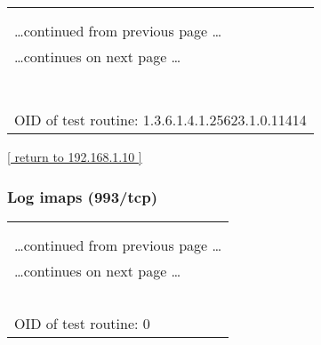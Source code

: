 \documentclass{article}
\begin{document}
\begin{longtable}{|p{}|}
\hline
\rowcolor{openvas_log}{\color{white}{Log (CVSS: 0.0) }}\\
\rowcolor{openvas_log}{\color{white}{NVT: IMAP Banner}}\\
\hline
\endfirsthead
\hfill\ldots continued from previous page \ldots \\
\hline
\endhead
\hline
\ldots continues on next page \ldots \\
\endfoot
\hline
\endlastfoot
\\
\rowcolor{white}{\verb=The remote imap server banner is :=}\\
\rowcolor{white}{\verb=* OK [CAPABILITY IMAP4rev1 LITERAL+ SASL-IR LOGIN-REFERRALS ID ENABLE STARTTLS L=}\\
\rowcolor{white}{$\hookrightarrow$\verb=OGINDISABLED] Dovecot ready. =}\\
\rowcolor{white}{\verb==}\\
\rowcolor{white}{\verb==}\\
\\
OID of test routine: 1.3.6.1.4.1.25623.1.0.11414\\
\end{longtable}

\begin{footnotesize}\hyperref[host:192.168.1.10]{[ return to 192.168.1.10 ]}\end{footnotesize}
\subsubsection{Log imaps (993/tcp)}
\label{port:192.168.1.10 imaps (993/tcp) Log}

\begin{longtable}{|p{}|}
\hline
\rowcolor{openvas_log}{\color{white}{Log}}\\
\rowcolor{openvas_log}{\color{white}{NVT: }}\\
\hline
\endfirsthead
\hfill\ldots continued from previous page \ldots \\
\hline
\endhead
\hline
\ldots continues on next page \ldots \\
\endfoot
\hline
\endlastfoot
\\
\rowcolor{white}{\verb=Open port.=}\\
\rowcolor{white}{\verb==}\\
\rowcolor{white}{\verb==}\\
\\
OID of test routine: 0\\
\end{longtable}
\end{document}
